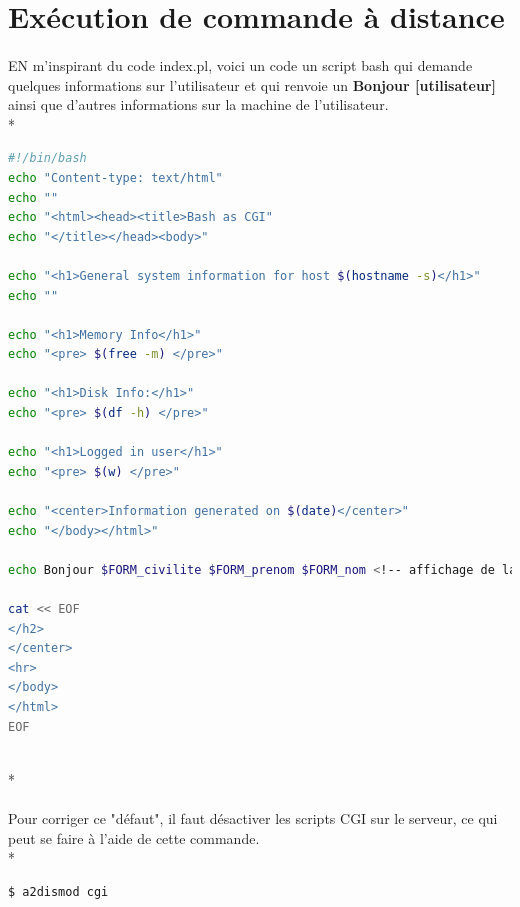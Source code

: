 \documentclass{article}
\begin{document}

\section{Ex\'{e}cution de commande \`{a} distance}

\paragraph{}
EN m'inspirant du code index.pl, voici un code un script bash qui demande quelques informations sur l'utilisateur et qui renvoie un \textbf{Bonjour [utilisateur]} ainsi que d'autres informations sur la machine de l'utilisateur. \\*
\begin{tcolorbox}
\begin{lstlisting}[language=sh]
#!/bin/bash
echo "Content-type: text/html"
echo ""
echo "<html><head><title>Bash as CGI"
echo "</title></head><body>"

echo "<h1>General system information for host $(hostname -s)</h1>"
echo ""

echo "<h1>Memory Info</h1>"
echo "<pre> $(free -m) </pre>"

echo "<h1>Disk Info:</h1>"
echo "<pre> $(df -h) </pre>"

echo "<h1>Logged in user</h1>"
echo "<pre> $(w) </pre>"

echo "<center>Information generated on $(date)</center>"
echo "</body></html>"

echo Bonjour $FORM_civilite $FORM_prenom $FORM_nom <!-- affichage de la civilit\'{e}, du prenom et du nom de la personne -->

cat << EOF
</h2>
</center>
<hr>
</body>
</html>
EOF
\end{lstlisting}
\end{tcolorbox}
~\\*
\paragraph{}
Pour corriger ce "d\'{e}faut", il faut d\'{e}sactiver les scripts CGI sur le serveur, ce qui peut se faire \`{a} l'aide de cette commande.\\*
\begin{tcolorbox}
\begin{lstlisting}[language=sh]
$ a2dismod cgi
\end{lstlisting}
\end{tcolorbox}
\end{document}
